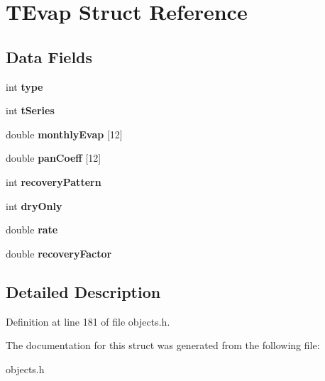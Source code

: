 \hypertarget{struct_t_evap}{}\section{T\+Evap Struct Reference}
\label{struct_t_evap}
\subsection*{Data Fields}
\begin{DoxyCompactItemize}
\item 
\mbox{\label{struct_t_evap_ac765329451135abec74c45e1897abf26}} 
int {\bfseries type}
\item 
\mbox{\label{struct_t_evap_a3de729b1c96053f3bd7fa21323bbb78c}} 
int {\bfseries t\+Series}
\item 
\mbox{\label{struct_t_evap_ad15ca9b627ddd388973c8a51311a9061}} 
double {\bfseries monthly\+Evap} \mbox{[}12\mbox{]}
\item 
\mbox{\label{struct_t_evap_a2ade38302d78fa1a754bb85c211633f1}} 
double {\bfseries pan\+Coeff} \mbox{[}12\mbox{]}
\item 
\mbox{\label{struct_t_evap_a4459618d334ed29d5f00e0cd9c1f879a}} 
int {\bfseries recovery\+Pattern}
\item 
\mbox{\label{struct_t_evap_adc3c66ab3c0c9979f499f600223531ad}} 
int {\bfseries dry\+Only}
\item 
\mbox{\label{struct_t_evap_a40fc078492fcc08ce7ad3957496b4c0b}} 
double {\bfseries rate}
\item 
\mbox{\label{struct_t_evap_acf881eb09e3f9413d833ae46a994c5a6}} 
double {\bfseries recovery\+Factor}
\end{DoxyCompactItemize}


\subsection{Detailed Description}


Definition at line 181 of file objects.\+h.



The documentation for this struct was generated from the following file\+:\begin{DoxyCompactItemize}
\item 
objects.\+h\end{DoxyCompactItemize}
